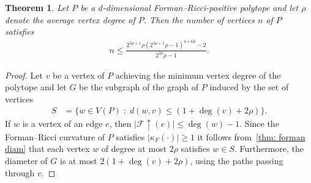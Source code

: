 \documentclass[11pt,a4paper]{amsart}
\newcommand{\forman}[1]{\kappa_F\left({#1}\right)}
\newcommand{\avgdegree}{\rho}
\newtheorem{theorem}{Theorem}[section]
\begin{document}
\begin{theorem}\label{thm:average-degree}
     Let $P$ be a $d$-dimensional Forman--Ricci-positive polytope and let $\avgdegree$ denote the average vertex degree of $P$. Then the number of vertices $n$ of $P$ satisfies
        \begin{align*}
            n\leq \frac{2^{3\avgdegree + 1}\avgdegree( 2^{3\avgdegree + 1}\avgdegree-1)^{4+6\avgdegree}-2}{ 2^{3\avgdegree }\avgdegree-1}.
        \end{align*}
\end{theorem}

\begin{proof}
    Let $v$ be a vertex of $P$ achieving the minimum vertex degree of the polytope and let $G$ be the subgraph of the graph of $P$ induced by the set of vertices
        \begin{align*}
            S &= \{w\in V(P) \;:\; d(w,v)\leq (1 + \deg(v) + 2\avgdegree)\}.
        \end{align*}
    If $w$ is a vertex of an edge $e$, then $|\mathcal{F}\uparrow(e)|\le \deg(w)-1$. Since the Forman--Ricci curvature of $P$ satisfies $|\forman{\cdot}|\geq 1$ it follows from~\cref{thm: forman diam} that each vertex $w$ of degree at most $2\avgdegree$ satisfies $w\in S$. Furthermore, the diameter of $G$ is at most $2(1 + \deg(v)+ 2\avgdegree)$, using the paths passing through $v$. 


\end{proof}
\end{document}
